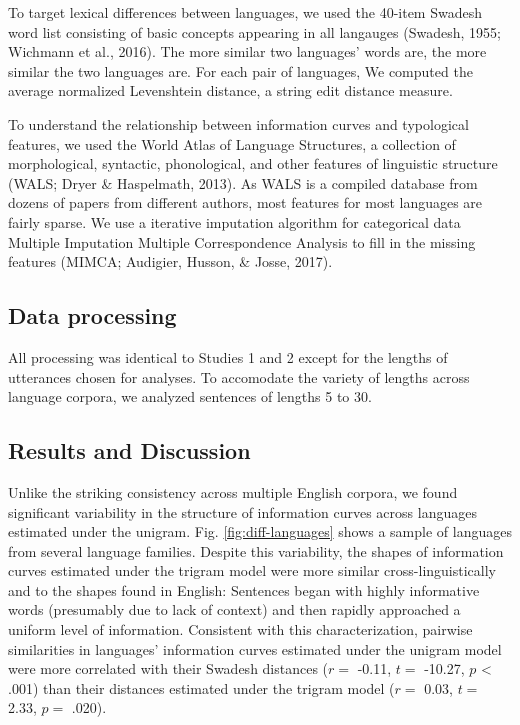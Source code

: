\documentclass[10pt, letterpaper]{article}
\begin{document}
To target lexical differences between languages, we used the 40-item
Swadesh word list consisting of basic concepts appearing in all
langauges (Swadesh, 1955; Wichmann et al., 2016). The more similar two
languages' words are, the more similar the two languages are. For each
pair of languages, We computed the average normalized Levenshtein
distance, a string edit distance measure.

To understand the relationship between information curves and
typological features, we used the World Atlas of Language Structures, a
collection of morphological, syntactic, phonological, and other features
of linguistic structure (WALS; Dryer \& Haspelmath, 2013). As WALS is a
compiled database from dozens of papers from different authors, most
features for most languages are fairly sparse. We use a iterative
imputation algorithm for categorical data Multiple Imputation Multiple
Correspondence Analysis to fill in the missing features (MIMCA;
Audigier, Husson, \& Josse, 2017).

\hypertarget{data-processing-1}{%
\subsection{Data processing}\label{data-processing-1}}

All processing was identical to Studies 1 and 2 except for the lengths
of utterances chosen for analyses. To accomodate the variety of lengths
across language corpora, we analyzed sentences of lengths 5 to 30.

\hypertarget{results-and-discussion-2}{%
\subsection{Results and Discussion}\label{results-and-discussion-2}}

Unlike the striking consistency across multiple English corpora, we
found significant variability in the structure of information curves
across languages estimated under the unigram. Fig.
\ref{fig:diff-languages} shows a sample of languages from several
language families. Despite this variability, the shapes of information
curves estimated under the trigram model were more similar
cross-linguistically and to the shapes found in English: Sentences began
with highly informative words (presumably due to lack of context) and
then rapidly approached a uniform level of information. Consistent with
this characterization, pairwise similarities in languages' information
curves estimated under the unigram model were more correlated with their
Swadesh distances (\(r =\) -0.11, \(t =\) -10.27, \(p\) \textless{}
.001) than their distances estimated under the trigram model (\(r =\)
0.03, \(t =\) 2.33, \(p =\) .020).
\end{document}
